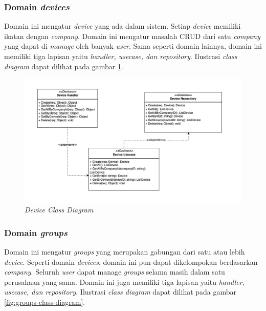 \pagebreak

\subsubsection{Domain \textit{devices}}

Domain ini mengatur \textit{device} yang ada dalam sistem. Setiap \textit{device} memiliki ikatan dengan \textit{company}. Domain ini mengatur masalah CRUD dari satu \textit{company} yang dapat di \textit{manage} oleh banyak \textit{user}. Sama seperti domain lainnya, domain ini memiliki tiga lapisan yaitu \textit{handler, usecase, dan repository}. Ilustrasi \textit{class diagram} dapat dilihat pada gambar \ref{fig:device-class-diagram}.

\begin{figure}[ht]
  \centering
  \includegraphics[width=1\textwidth]{resources/chapter-3/class/device-class-diagram.jpg}
  \caption{\textit{Device Class Diagram}}
  \label{fig:device-class-diagram}
\end{figure}

\subsubsection{Domain \textit{groups}}

Domain ini mengatur \textit{groups} yang merupakan gabungan dari satu atau lebih \textit{device}. Seperti domain \textit{devices}, domain ini pun dapat dikelompokan berdasarkan \textit{company}. Seluruh \textit{user} dapat manage \textit{groups} selama masih dalam satu perusahaan yang sama. Domain ini juga memiliki tiga lapisan yaitu \textit{handler, usecase, dan repository}. Ilustrasi \textit{class diagram} dapat dilihat pada gambar \ref{fig:groups-class-diagram}.

